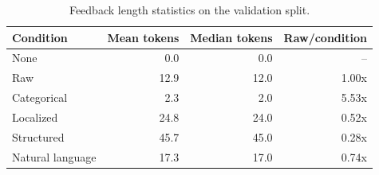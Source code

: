 \begin{table}[t]
\centering
\caption{Feedback length statistics on the validation split.}
\label{tab:feedback-length}
\begin{tabular}{lrrr}
\toprule
Condition & Mean tokens & Median tokens & Raw/condition \\
\midrule
None & 0.0 & 0.0 & -- \\
Raw & 12.9 & 12.0 & 1.00x \\
Categorical & 2.3 & 2.0 & 5.53x \\
Localized & 24.8 & 24.0 & 0.52x \\
Structured & 45.7 & 45.0 & 0.28x \\
Natural language & 17.3 & 17.0 & 0.74x \\
\bottomrule
\end{tabular}
\end{table}
